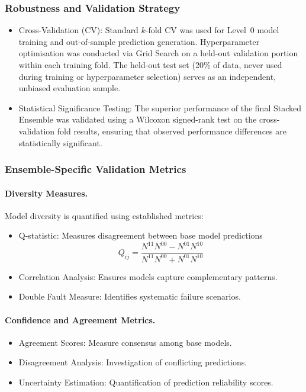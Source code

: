 \documentclass[12pt,a4paper,oneside]{report}
\numberwithin{equation}{chapter}
\begin{document}
\subsubsection{Robustness and Validation Strategy}
\label{sec:robustness-validation}

\begin{itemize}
    \item Cross-Validation (CV): Standard $k$-fold CV was used for Level~0 model training and out-of-sample prediction generation. Hyperparameter optimisation was conducted via Grid Search on a held-out validation portion within each training fold. The held-out test set (20\% of data, never used during training or hyperparameter selection) serves as an independent, unbiased evaluation sample.
    \item Statistical Significance Testing: The superior performance of the final Stacked Ensemble was validated using a Wilcoxon signed-rank test on the cross-validation fold results, ensuring that observed performance differences are statistically significant.
\end{itemize}

\subsubsection{Ensemble-Specific Validation Metrics}
\label{subsec:ensemble-validation}

\paragraph{Diversity Measures.}
Model diversity is quantified using established metrics:
\begin{itemize}
    \item Q-statistic: Measures disagreement between base model predictions
    \begin{equation}
        Q_{ij} = \frac{N^{11}N^{00} - N^{01}N^{10}}{N^{11}N^{00} + N^{01}N^{10}}
        \label{eq:q_stat_def}
    \end{equation}
    \item Correlation Analysis: Ensures models capture complementary patterns.
    \item Double Fault Measure: Identifies systematic failure scenarios.
\end{itemize}

\paragraph{Confidence and Agreement Metrics.}
\begin{itemize}
    \item Agreement Scores: Measure consensus among base models.
    \item Disagreement Analysis: Investigation of conflicting predictions.
    \item Uncertainty Estimation: Quantification of prediction reliability scores.
\end{itemize}
\end{document}
